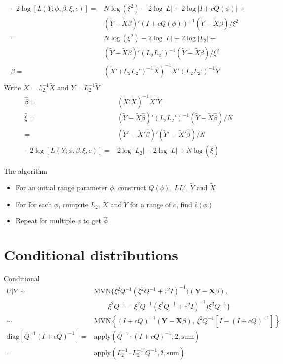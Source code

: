 \documentclass[12pt]{article}
\begin{document}
\begin{align*}
-2 \log[L(Y;\phi,\beta,\xi,c)] = &
N \log(\xi^2) - 2 \log |L|  + 2 \log |I + cQ(\phi)| + \\
&(\tilde Y - \tilde X \beta)' (  I + cQ(\phi) )^{-1}
 (\tilde Y - \tilde X \beta)/\xi^2\\
= & N \log(\xi^2) - 2 \log |L| + 2 \log |L_2| +  \\
&(\tilde Y - \tilde X \beta)' ( L_2 L_2' )^{-1}
 (\tilde Y - \tilde X
\beta)/\xi^2\\
\hat\beta = &(\tilde X' (L_2 L_2' )^{-1} \tilde X)^{-1} \tilde X'(L_2 L_2'
)^{-1} \tilde Y\\
\end{align*}
Write $\breve X = L_2^{-1} \tilde X$ and $\breve Y = L_2^{-1} \tilde Y$ 
\begin{align*}
\hat\beta = & (\breve X' \breve X)^{-1} \breve X' \breve Y\\
\hat\xi =&    (\tilde Y - \tilde X \hat \beta)' ( L_2 L_2' )^{-1}%
(\tilde Y - \tilde X \hat \beta)/N\\
 = & (\breve Y' - \breve X' \hat\beta)'%
  (\breve Y' - \breve X' \hat\beta) / N\\
  -2 \log[L(Y;\phi,\beta,\xi,c)] =  &  2 \log |L_2| - 2 \log |L| + N
  \log(\hat\xi)
\end{align*}


The algorithm
\begin{itemize}
  \item For an initial range parameter $\phi$, construct $Q(\phi)$, $LL'$,
  $\tilde Y$ and $\tilde X$
  \item For for each $\phi$, compute $L_2$, $\breve X$ and $\breve Y$ for a
  range of $c$, find $\hat c(\phi)$
  \item Repeat for multiple $\phi$ to get $\hat \phi$
\end{itemize}

\section*{Conditional distributions}
Conditional
\begin{align*}
U|Y \sim & \text{MVN}\{\xi^2Q^{-1}(\xi^2 Q^{-1} + \tau^2 I)^{-1})
(\mathbf{Y} - \mathbf{X}\beta), \\ 
&\qquad 
\xi^2Q^{-1}- \xi^2Q^{-1}( \xi^2Q^{-1} + \tau^2 I  )^{-1})\xi^2 Q^{-1} \}\\
\sim &\text{MVN}\left\{  ( I + c Q  )^{-1}  (\mathbf{Y} -
\mathbf{X}\beta),\ \xi^2 Q^{-1}[I- ( I + cQ  )^{-1}	 ] \right\}\\
\text{diag}\left[Q^{-1} ( I + c Q  )^{-1}\right]	= & 
\text{apply}(Q^{-1} \cdot
( I + c Q  )^{-1}, 2,\text{sum})\\
= & \text{apply}(L_2^{-1}\cdot L_2^{-1\prime}Q^{-1},2,\text{sum})
\end{align*}
\end{document}
